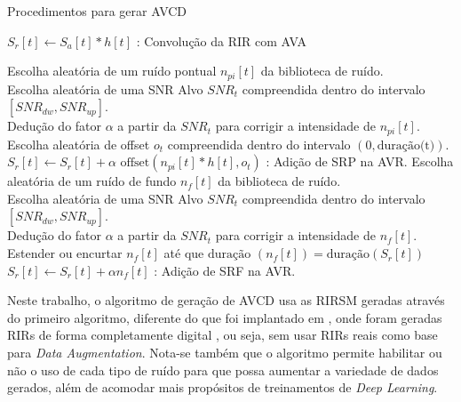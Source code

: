 \begin{algorithm} [H] 
    \caption{Procedimentos para gerar AVCD}
    \label{alg:AVCD-gen}


    $S_r[t] \gets S_a[t] \ast h[t]$ : Convolução da RIR com AVA

    {
        {
            Escolha aleatória de um ruído pontual $n_{pi}[t]$ da biblioteca de ruído. \\
            Escolha aleatória de uma SNR Alvo $SNR_t$ compreendida dentro do intervalo $[SNR_{dw},SNR_{up}]$. \\
            Dedução do fator $\alpha$ a partir da $SNR_t$ para corrigir a intensidade de $n_{pi}[t]$. \\
            Escolha aleatória de offset $o_t$ compreendida dentro do intervalo $(0,\text{duração(t)})$. \\
            $S_r[t] \gets S_r[t] + \alpha \text{ offset}(n_{pi}[t] \ast h[t], o_t)$ : Adição de SRP na AVR.
        }
    }
    {
        Escolha aleatória de um ruído de fundo $n_f[t]$ da biblioteca de ruído. \\
        Escolha aleatória de uma SNR Alvo $SNR_t$ compreendida dentro do intervalo $[SNR_{dw},SNR_{up}]$. \\
        Dedução do fator $\alpha$ a partir da $SNR_t$ para corrigir a intensidade de $n_f[t]$. \\
        Estender ou encurtar $n_f[t]$ até que $\text{duração }(n_f[t]) = \text{duração}(S_r[t])$
        $S_r[t] \gets S_r[t] + \alpha n_f[t]$ : Adição de SRF na AVR.
    }

\end{algorithm}
\pagebreak


Neste trabalho, o algoritmo de geração de AVCD usa as RIRSM geradas através do primeiro algoritmo, diferente do que foi implantado
em \cite{Speech_Rec}, onde foram geradas RIRs de forma completamente digital \cite{RIR_sim_image}, ou seja, sem usar RIRs reais 
como base para \textit{Data Augmentation}.
Nota-se também que o algoritmo permite habilitar ou não o uso de cada tipo de ruído para que possa aumentar a variedade de dados gerados, além
de acomodar mais propósitos de treinamentos de \textit{Deep Learning}.


